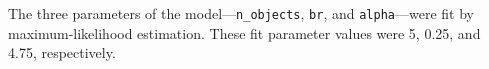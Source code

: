 \documentclass[10pt,letterpaper]{article}
\begin{document}
The three parameters of the model---\lstinline{n_objects}, \lstinline{br}, and \lstinline{alpha}---were fit by maximum-likelihood estimation. These fit parameter values were 5, 0.25, and 4.75, respectively.%


%
%
%
%
%
%
%
\end{document}
